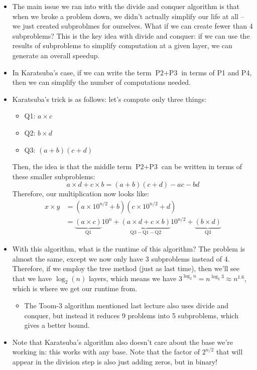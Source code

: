 \begin{itemize}
	\item The main issue we ran into with the divide and conquer algorithm is that when we broke a problem down, we didn't 
		actually simplify our life at all -- we just created subproblmes for ourselves. What if we can create 
		fewer than 4 subproblems? This is the key idea with divide and conquer: if we can use the results of subproblems 
		to simplify computation at a given layer, we can generate an overall speedup.
	\item In Karatsuba's case, if we can write the term \( \text{P2} + \text{P3} \) in terms of P1 and P4, then we can 
		simplify the number of computations needed. 
	\item Karatsuba's trick is as follows: let's compute only three things:
		\begin{itemize}
			\item Q1: \( a \times c \) 
			\item Q2: \( b \times d \) 
			\item Q3: \( (a + b)(c + d) \)
		\end{itemize}
		Then, the idea is that the middle term \( \text{P2} +  \text{P3} \) can be written in terms of these smaller subproblems:
		\[
		a\times d + c\times b = (a + b)(c + d) - ac - bd
		\] 
		Therefore, our multiplication now looks like:
		\begin{align*}
			x \times y &= \left( a \times 10^{n / 2} + b \right) \left( c \times 10^{n /2} + d \right) \\
					   &= \underbrace{(a \times c)}_{\text{Q1}} 10^{n} + \underbrace{(a \times d + c \times b)}_{\text{Q3} - 
					   \text{Q1} - \text{Q2}} 10^{ n / 2} + \underbrace{(b \times d)}_{\text{Q3}}
		\end{align*}
	\item With this algorithm, what is the runtime of this algorithm? The problem is almost the same, except we now only have 
		3 subproblems instead of 4. Therefore, if we employ the tree method (just as last time), then we'll see that 
		we have \( \log_2(n) \) layers, which means we have \( 3^{\log_2 n} = n^{\log_2 3} \approx n^{1.6} \), which is 
		where we get our runtime from.
		\begin{itemize}
			\item The Toom-3 algorithm mentioned last lecture also uses divide and conquer, but instead it reduces 
				9 problems into 5 subproblems, which gives a better bound. 
		\end{itemize}
	\item Note that Karatsuba's algorithm also doesn't care about the base we're working in: this works with any base. 
		Note that the factor of \( 2^{n /2} \) that will appear in the division step is also just adding zeros, but in binary! 
\end{itemize}
